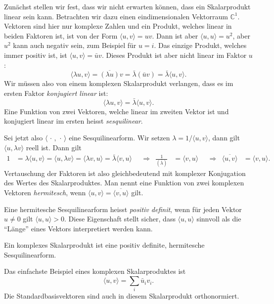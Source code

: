 Zunächst stellen wir fest, dass wir nicht erwarten können, dass
ein Skalarprodukt linear sein kann.
Betrachten wir dazu einen eindimensionalen Vektorraum $\mathbb C^1$.
Vektoren sind hier nur komplexe Zahlen und ein Produkt, welches
linear in beiden Faktoren ist, ist von der Form $\langle u,v\rangle=uv$.
Dann ist aber $\langle u,u\rangle=u^2$, aber $u^2$ kann auch negativ sein,
zum Beispiel für $u=i$.
Das einzige Produkt, welches immer positiv ist, ist $\langle u,v\rangle=\bar uv$.
Dieses Produkt ist aber nicht linear im Faktor $u$:
\[
\langle\lambda u,v\rangle=\overline{(\lambda u)}v=\bar\lambda (\bar uv)=\bar\lambda \langle u,v\rangle.
\]
Wir müssen also von einem komplexen Skalarprodukt verlangen, dass es
im ersten Faktor {\em konjugiert linear} ist:
\[
\langle\lambda u,v\rangle=\bar\lambda\langle u,v\rangle.
\]
Eine Funktion von zwei Vektoren, welche linear im zweiten Vektor ist
und konjugiert linear im ersten heisst {\em sesquilinear}.
%
%

Sei jetzt also $\langle\,\cdot\,,\,\cdot\,\rangle$ eine Sesquilinearform.
Wir setzen $\lambda = 1/\langle u,v\rangle$, dann gilt
$\langle u,\lambda v\rangle$ reell ist. Dann gilt
\begin{align*}
1&=\lambda \langle u,v\rangle=\langle u,\lambda v\rangle
=
\langle \lambda v,u\rangle=\bar\lambda\langle v,u\rangle
&
&\Rightarrow&
\frac1{(\bar\lambda)}&=\langle v,u\rangle
&
&\Rightarrow&
\overline{\langle u,v\rangle}&=\langle v,u\rangle.
\end{align*}
Vertauschung der Faktoren ist also gleichbedeutend mit komplexer Konjugation
des Wertes des Skalarproduktes.
Man nennt eine Funktion von zwei komplexen Vektoren {\em hermitesch},
wenn $\langle u,v\rangle=\overline{\langle v,u\rangle}$ gilt.

Eine hermitesche Sesquilinearform heisst {\em positiv definit}, wenn
für jeden Vektor $u\ne 0$ gilt $\langle u,u\rangle>0$.
Diese Eigenschaft stellt
sicher, dass $\langle u,u\rangle$ sinnvoll als die ``Länge'' eines Vektors
interpretiert werden kann.

\begin{definition}
Ein komplexes Skalarprodukt ist eine positiv definite,
hermitesche Sesquilinearform.
\end{definition}

Das einfachste Beispiel eines komplexen Skalarproduktes ist
\[
\langle u,v\rangle =\sum_i \bar u_iv_i.
\]
Die Standardbasisvektoren sind auch in diesem Skalarprodukt
orthonormiert.

